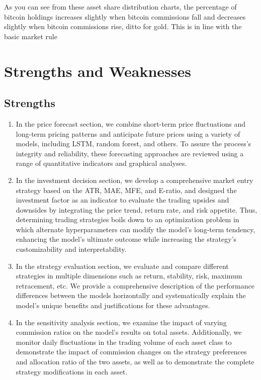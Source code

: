 \documentclass{mcmthesis}
\begin{document}
As you can see from these asset share distribution charts, the percentage of bitcoin holdings increases slightly when bitcoin commissions fall and decreases slightly when bitcoin commissions rise, ditto for gold. This is in line with the basic market rule


\section{Strengths and Weaknesses}
\subsection{Strengths}
\begin{enumerate}
	\item In the price forecast section, we combine short-term price fluctuations and long-term pricing patterns and anticipate future prices using a variety of models, including LSTM, random forest, and others. To assure the process's integrity and reliability, these forecasting approaches are reviewed using a range of quantitative indicators and graphical analyses.
	\item In the investment decision section, we develop a comprehensive market entry strategy based on the ATR, MAE, MFE, and E-ratio, and designed the investment factor as an indicator to evaluate the trading upsides and downsides by integrating the price trend, return rate, and risk appetite. Thus, determining trading strategies boils down to an optimization problem in which alternate hyperparameters can modify the model's long-term tendency, enhancing the model's ultimate outcome while increasing the strategy's customizability and interpretability.
	\item In the strategy evaluation section, we evaluate and compare different strategies in multiple dimensions such as return, stability, risk, maximum retracement, etc. We provide a comprehensive description of the performance differences between the models horizontally and systematically explain the model's unique benefits and justifications for these advantages.
	\item In the sensitivity analysis section, we examine the impact of varying commission ratios on the model's results on total assets. Additionally, we monitor daily fluctuations in the trading volume of each asset class to demonstrate the impact of commission changes on the strategy preferences and allocation ratio of the two assets, as well as to demonstrate the complete strategy modifications in each asset.
\end{enumerate}
\end{document}
